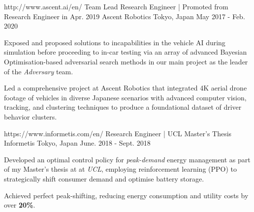 \begin{cventries}
  \cventry
    {http://www.ascent.ai/en/}
    {Team Lead Research Engineer | Promoted from Research Engineer in Apr. 2019} %
    {Ascent Robotics} %
    {Tokyo, Japan} %
    {May 2017 - Feb. 2020} %
    {
      \begin{cvitems} %
        \item {Exposed and proposed solutions to incapabilities in the vehicle AI during simulation before proceeding to in-car testing via an array of advanced Bayesian Optimisation-based adversarial search methods in our main project as the leader of the \emph{Adversary} team.}
        \item {Led a comprehensive project at Ascent Robotics that integrated 4K aerial drone footage of vehicles in diverse Japanese scenarios with advanced computer vision, tracking, and clustering techniques to produce a foundational dataset of driver behavior clusters.}
      \end{cvitems}
    }

  \cventry
    {https://www.informetis.com/en/}
    {Research Engineer | UCL Master's Thesis} %
    {Informetis} %
    {Tokyo, Japan} %
    {June. 2018 - Sept. 2018} %
    {
      \begin{cvitems} %
        \item {Developed an optimal control policy for \emph{peak-demand} energy management as part of my Master's thesis at at \emph{UCL}, employing reinforcement learning (PPO) to strategically shift consumer demand and optimise battery storage.}
        \item {Achieved perfect peak-shifting, reducing energy consumption and utility costs by over \textbf{20\%}.}
      \end{cvitems}
    }


\end{cventries}
